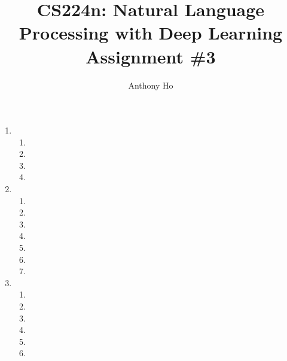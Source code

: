 \documentclass[10pt,reqno]{amsart}
\begin{document}
\title{CS224n: Natural Language Processing with Deep Learning\\Assignment \#3}
\author{Anthony Ho}
\maketitle


\newcommand{\f}{\frac}
\newcommand{\pd}[1]{\frac{\partial}{\partial #1}}
\newcommand{\pdd}[2]{\frac{\partial #1}{\partial #2}}
\newcommand{\softmax}{\text{softmax}}


\renewcommand{\labelenumi}{\arabic{enumi}.}
\begin{enumerate}[topsep=0pt,itemsep=3ex,partopsep=1ex,parsep=1ex]


\item
  \begin{enumerate}[itemsep=2ex]
  \item 
  \item 
  \item %
  \item 
  \end{enumerate}


\item
  \begin{enumerate}[itemsep=2ex]
  \item 
  \item 
  \item %
  \item 
  \item %
  \item %
  \item 
  \end{enumerate}


\item
  \begin{enumerate}[itemsep=2ex]
  \item 
  \item
  \item %
  \item %
  \item 
  \item %
  \end{enumerate}


\end{enumerate}
\end{document}
